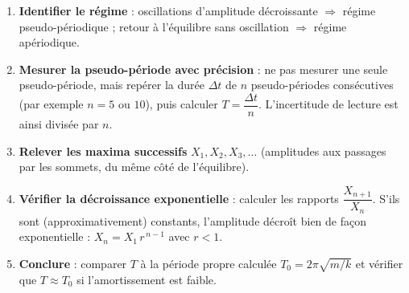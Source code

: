 \documentclass[11pt]{article}
\begin{document}
\begin{methode}
\begin{enumerate}
\item \textbf{Identifier le régime} : oscillations d'amplitude décroissante $\Rightarrow$ régime pseudo-périodique ; retour à l'équilibre sans oscillation $\Rightarrow$ régime apériodique.
\item \textbf{Mesurer la pseudo-période avec précision} : ne pas mesurer une seule pseudo-période, mais repérer la durée $\Delta t$ de $n$ pseudo-périodes consécutives (par exemple $n = 5$ ou $10$), puis calculer $T = \dfrac{\Delta t}{n}$. L'incertitude de lecture est ainsi divisée par $n$.
\item \textbf{Relever les maxima successifs} $X_1, X_2, X_3, \dots$ (amplitudes aux passages par les sommets, du même côté de l'équilibre).
\item \textbf{Vérifier la décroissance exponentielle} : calculer les rapports $\dfrac{X_{n+1}}{X_n}$. S'ils sont (approximativement) constants, l'amplitude décroît bien de façon exponentielle : $X_n = X_1\,r^{\,n-1}$ avec $r < 1$.
\item \textbf{Conclure} : comparer $T$ à la période propre calculée $T_0 = 2\pi\sqrt{m/k}$ et vérifier que $T \approx T_0$ si l'amortissement est faible.
\end{enumerate}
\end{methode}
\end{document}
